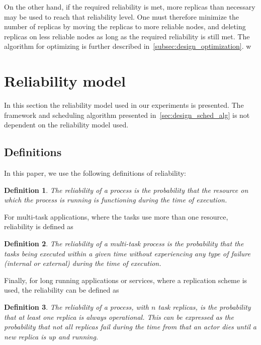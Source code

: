 \documentclass{cslthse-msc}
\newtheorem{definition}{Definition}[chapter]
\begin{document}
On the other hand, if the required reliability is met, more replicas than necessary may be used to reach that reliability level. One must therefore minimize the number of replicas by moving the replicas to more reliable nodes, and deleting replicas on less reliable nodes as long as the required reliability is still met. The algorithm for optimizing is further described in~\cref{subsec:design_optimization}.
w

\section{Reliability model} \label{sec:design_reliability_model}
In this section the reliability model used in our experiments is presented. The framework and scheduling algorithm presented in~\cref{sec:design_sched_alg} is not dependent on the reliability model used.

\subsection{Definitions} \label{subsec:design_definitions}
In this paper, we use the following definitions of reliability:
\begin{definition} \label{def:single_task_reliability}
The reliability of a process is the probability that the resource on which the process is running is functioning during the time of execution.
\end{definition}

For multi-task applications, where the tasks use more than one resource, reliability is defined as
\begin{definition} \label{def:multi_task_reliability}
The reliability of a multi-task process is the probability that the tasks being executed within a given time without experiencing any type of failure (internal or external) during the time of execution.
\end{definition}

Finally, for long running applications or services, where a replication scheme is used, the reliability can be defined as \cite{effTaskReplMobGrid}
\begin{definition} \label{def:task_replica_reliability}
The reliability of a process, with $n$ task replicas, is the probability that at least one replica is always operational. This can be expressed as the probability that not all replicas fail during the time from that an actor dies until a new replica is up and running.
\end{definition}
\end{document}
